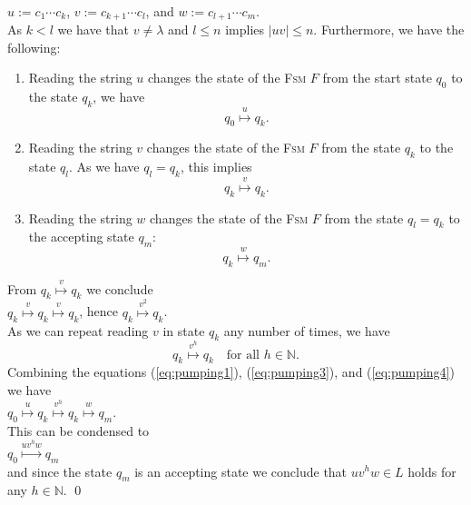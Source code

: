 \\[0.2cm]
\hspace*{1.3cm}
$u := c_1 \cdots c_k$, \quad $v := c_{k+1} \cdots c_l$, \quad and \quad $w := c_{l+1} \cdots c_{m}$.
\\[0.2cm]
As $k < l$ we have that $v \not= \lambda$ and $l \leq n$ implies $|uv| \leq n$.
Furthermore, we have the following:
\begin{enumerate}
\item Reading the string $u$ changes the state of the \textsc{Fsm} $F$ from the start state $q_0$ to
      the state $q_k$, we have
      \begin{equation}
        \label{eq:pumping1}
        q_0 \stackrel{u}{\longmapsto} q_k.    
      \end{equation}
\item Reading the string $v$ changes the state of the \textsc{Fsm} $F$ from the state $q_k$ to the
      state $q_l$.  As we have $q_l = q_k$, this implies
      \begin{equation}
        \label{eq:pumping2}
      q_k \stackrel{v}{\longmapsto} q_k.        
      \end{equation}
\item Reading the string $w$ changes the state of the \textsc{Fsm} $F$ from the state  $q_l = q_k$
      to the accepting state $q_m$:
      \begin{equation}
        \label{eq:pumping3}
        q_k \stackrel{w}{\longmapsto} q_m.        
      \end{equation}
\end{enumerate}
From $q_k \stackrel{v}{\longmapsto} q_k$ we conclude
\\[0.2cm]
\hspace*{1.3cm}
$q_k \stackrel{v}{\longmapsto} q_k \stackrel{v}{\longmapsto} q_k$, \quad hence \quad $q_k \stackrel{v^2}{\longmapsto} q_k$.
\\[0.2cm]
As we can repeat reading $v$ in state $q_k$ any number of times, we have
\begin{equation}
  \label{eq:pumping4}
  q_k \stackrel{v^h}{\longmapsto} q_k  \quad \mbox{for all $h \in \mathbb{N}$.}
\end{equation}
Combining the equations (\ref{eq:pumping1}), (\ref{eq:pumping3}), and (\ref{eq:pumping4})  we have
\\[0.2cm]
\hspace*{1.3cm}
$q_0 \stackrel{u}{\longmapsto} q_k \stackrel{v^h}{\longmapsto} q_k \stackrel{w}{\longmapsto} q_m$.
\\[0.2cm]
This can be condensed to
\\[0.2cm]
\hspace*{1.3cm}
$q_0 \stackrel{uv^hw}{\longmapsto} q_m$
\\[0.2cm]
and since the state $q_m$ is an accepting state we conclude that $uv^hw \in L$ holds for any $h \in \mathbb{N}$. \qed




